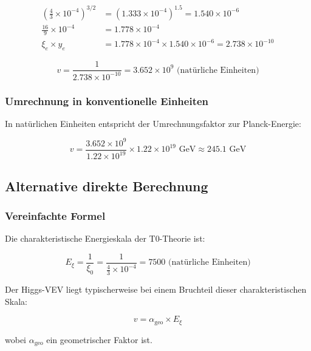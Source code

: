 \begin{align}
	\left(\frac{4}{3} \times 10^{-4}\right)^{3/2} &= (1.333 \times 10^{-4})^{1.5} = 1.540 \times 10^{-6}\\
	\frac{16}{9} \times 10^{-4} &= 1.778 \times 10^{-4}\\
	\xi_e \times y_e &= 1.778 \times 10^{-4} \times 1.540 \times 10^{-6} = 2.738 \times 10^{-10}
\end{align}

\begin{equation}
	v = \frac{1}{2.738 \times 10^{-10}} = 3.652 \times 10^9 \text{ (natürliche Einheiten)}
\end{equation}

\subsubsection{Umrechnung in konventionelle Einheiten}

In natürlichen Einheiten entspricht der Umrechnungsfaktor zur Planck-Energie:

\begin{equation}
	v = \frac{3.652 \times 10^9}{1.22 \times 10^{19}} \times 1.22 \times 10^{19} \text{ GeV} \approx 245.1 \text{ GeV}
\end{equation}

\subsection{Alternative direkte Berechnung}

\subsubsection{Vereinfachte Formel}

Die charakteristische Energieskala der T0-Theorie ist:

\begin{equation}
	E_\xi = \frac{1}{\xi_0} = \frac{1}{\frac{4}{3} \times 10^{-4}} = 7500 \text{ (natürliche Einheiten)}
\end{equation}

Der Higgs-VEV liegt typischerweise bei einem Bruchteil dieser charakteristischen Skala:

\begin{equation}
	v = \alpha_{\text{geo}} \times E_\xi
\end{equation}

wobei $\alpha_{\text{geo}}$ ein geometrischer Faktor ist.

